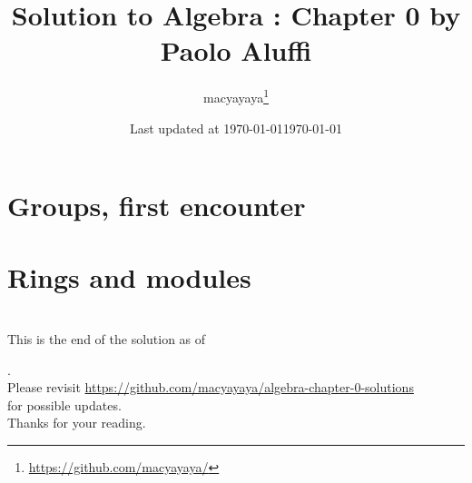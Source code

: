 \documentclass[12pt,a4paper,dvipsnames,oneside]{book}
\title{Solution to Algebra : Chapter 0 by Paolo Aluffi}
\author{macyayaya\thanks{\href{https://github.com/macyayaya/}{https://github.com/macyayaya/}}}
\date{Last updated at \today}
\theoremstyle{definition}
\begin{document}
\setcounter{chapter}{1}
\frontmatter
\maketitle

\tableofcontents
\mainmatter
\chapter{Groups, first encounter}

\newpage
\chapter{Rings and modules}

\newpage

\backmatter
\chapter{}
\thispagestyle{empty}
\begin{center}
\large{
This is the end of the solution as of \date{\today}. \\
Please revisit \href{https://github.com/macyayaya/algebra-chapter-0-solutions}{https://github.com/macyayaya/algebra-chapter-0-solutions} \\
for possible updates. \\
Thanks for your reading.
}
\end{center}
\end{document}

